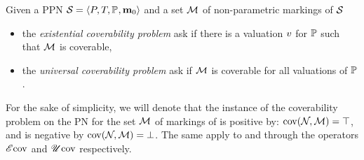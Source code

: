 \begin{defi}
  Given a \ac{PPN} $\defPPN$ and a set $\mathcal{M}$ of non-parametric markings of $\mathcal{S}_{{}}$
  \begin{itemize}
    \item the \emph{existential coverability problem} ask if there is a valuation $\val$ for $\mathbb{P}$ such that $\mathcal{M}$ is coverable,
    \item the \emph{universal   coverability problem} ask if $\mathcal{M}$ is coverable for all valuations of $\mathbb{P}$.
  \end{itemize}
\end{defi}

For the sake of simplicity, we will denote that the instance of the coverability problem on the \ac{PN} \namePN for the set $\mathcal{M}$ of markings of \namePN is positive by: $\operatorname{cov}(\mathcal{N}_{}, \mathcal{M}) = \top$, and is negative by $\operatorname{cov}(\mathcal{N}_{}, \mathcal{M}) = \bot$. The same apply to \Ecov and \Ucov through the operators $\operatorname{\mathscr{E}cov}$ and $\operatorname{\mathscr{U}cov}$ respectively.
